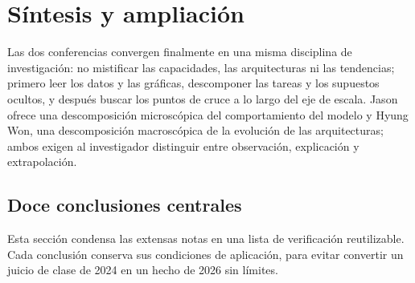 \section{Síntesis y ampliación}

Las dos conferencias convergen finalmente en una misma disciplina de investigación: no mistificar las capacidades, las arquitecturas ni las tendencias; primero leer los datos y las gráficas, descomponer las tareas y los supuestos ocultos, y después buscar los puntos de cruce a lo largo del eje de escala. Jason ofrece una descomposición microscópica del comportamiento del modelo y Hyung Won, una descomposición macroscópica de la evolución de las arquitecturas; ambos exigen al investigador distinguir entre observación, explicación y extrapolación.

\subsection{Doce conclusiones centrales}

Esta sección condensa las extensas notas en una lista de verificación reutilizable. Cada conclusión conserva sus condiciones de aplicación, para evitar convertir un juicio de clase de 2024 en un hecho de 2026 sin límites.

